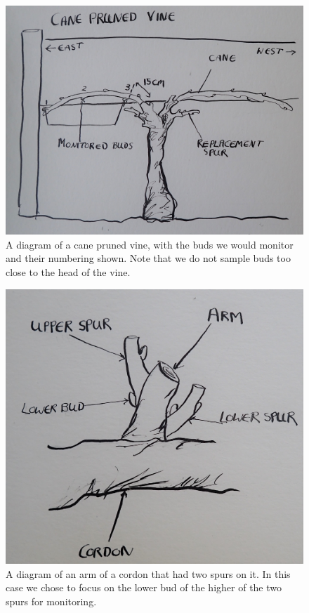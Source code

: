 \documentclass[11pt,letter]{article}
\begin{document}
\begin{figure}%
  \includegraphics[width=\linewidth]{CanePruned.jpg}
  \caption{A diagram of a cane pruned vine, with the buds we would monitor and their numbering shown. Note that we do not sample buds too close to the head of the vine.}
  \label{fig:CanePruned}
\end{figure}

\begin{figure}%
  \includegraphics[width=\linewidth]{TwoSpurs.jpg}
  \caption{A diagram of an arm of a cordon that had two spurs on it. In this case we chose to focus on the lower bud of the higher of the two spurs for monitoring. }
  \label{fig:TwoSpurs}
\end{figure}
\end{document}

